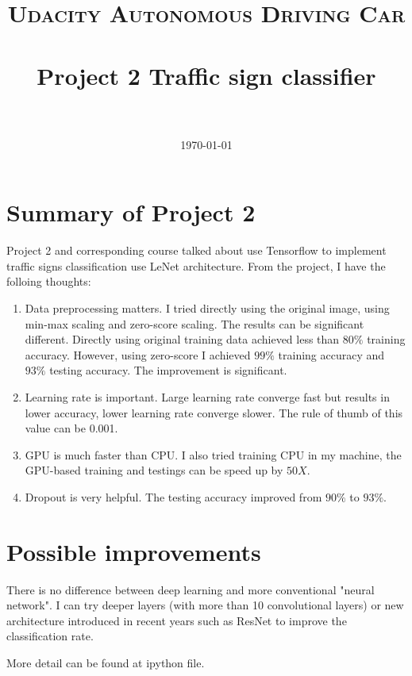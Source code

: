 \documentclass[paper=a4, fontsize=11pt]{scrartcl}
\title{
		\usefont{OT1}{bch}{b}{n}
		\normalfont \normalsize \textsc{Udacity Autonomous Driving Car} \\ [25pt]
		\horrule{0.5pt} \\[0.4cm]
		\huge Project 2 Traffic sign classifier \\
		\horrule{2pt} \\[0.5cm]
}
\author{
		\normalfont 								\normalsize
        \today
}
\date{}
\numberwithin{equation}{section}		%
\numberwithin{figure}{section}			%
\numberwithin{table}{section}				%
\begin{document}
\maketitle
\section{Summary of Project 2}
Project 2 and corresponding course talked about use Tensorflow to implement traffic signs classification use LeNet architecture. From the project, I have the folloing thoughts:
\begin{enumerate}
	\item Data preprocessing matters. I tried directly using the original image, using min-max scaling and zero-score scaling. The results can be significant different. Directly using original training data achieved less than $80\%$ training accuracy. However, using zero-score I achieved $99\%$ training accuracy and $93\%$ testing accuracy. The improvement is significant.
	\item Learning rate is important. Large learning rate converge fast but results in lower accuracy, lower learning rate converge slower. The rule of thumb of this value can be 0.001.
	\item GPU is much faster than CPU. I also tried training CPU in my machine, the GPU-based training and testings can be speed up by $50X$.
	\item Dropout is very helpful. The testing accuracy improved from $90\%$ to $93\%$.
\end{enumerate}

\section{Possible improvements}
There is no difference between deep learning and more conventional "neural network". I can try deeper layers (with more than 10 convolutional layers) or new architecture introduced in recent years such as ResNet to improve the classification rate.

More detail can be found at ipython file.
\end{document}
